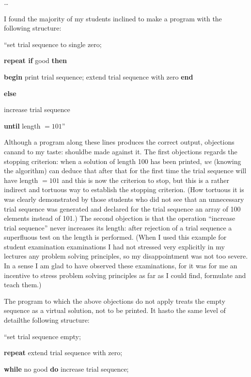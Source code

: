 \dots

I found the majority of my students inclined to make a program with the following structure:

\hspace{-.4em}``set trial sequence to single zero;

\textbf{repeat if} good \textbf{then}

\quad \textbf{begin} print trial sequence; extend trial sequence with zero \textbf{end}

\quad\quad\quad \textbf{else}

\quad increase trial sequence

\textbf{until} length $= 101$''

Although a program along these lines produces the correct output, objections can\textemdash{}and to my taste: should\textemdash{}be made against it. The first objections regards the stopping criterion: when a solution of length 100 has been printed, \textit{we} (knowing the algorithm) can deduce that after that for the first time the trial sequence will have length $= 101$ and this is now the criterion to stop, but this is a rather indirect and tortuous way to establish the stopping criterion. (How tortuous it is was clearly demonstrated by those students who did not see that an unnecessary trial sequence was generated and declared for the trial sequence an array of 100 elements instead of 101.) The second objection is that the operation ``increase trial sequence'' never increases its length: after rejection of a trial sequence a superfluous test on the length is performed. (When I used this example for student examination examinations I had not stressed very explicitly in my lectures any problem solving principles, so my disappointment was not too severe. In a sense I am glad to have observed these examinations, for it was for me an incentive to stress problem solving principles as far as I could find, formulate and teach them.)

The program to which the above objections do not apply treats the empty sequence as a virtual solution, not to be printed. It has\textemdash{}to the same level of detail\textemdash{}the following structure:

\quad \hspace{-.4em}``set trial sequence empty;

\quad \textbf{repeat} extend trial sequence with zero;

\quad \quad \textbf{while} no good \textbf{do} increase trial sequence;

